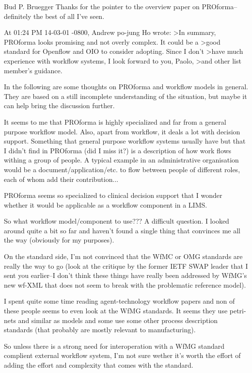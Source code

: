 Bud P. Bruegger \cite{openoutcomesgeneral}
Thanks for the pointer to the overview paper on PROforma--definitely the
best of all I've seen.

At 01:24 PM 14-03-01 -0800, Andrew po-jung Ho wrote:
>In summary, PROforma looks promising and not overly complex. It could be a
>good standard for Openflow and OIO to consider adopting. Since I don't
>have much experience with workflow systems, I look forward to you, Paolo,
>and other list member's guidance.

In the following are some thoughts on PROforma and workflow models in
general.  They are based on a still incomplete understanding of the
situation, but maybe it can help bring the discussion further.

It seems to me that PROforma is highly specialized and far from a general
purpose workflow model.  Also, apart from workflow, it deals a lot with
decision support.  Something that general purpose workflow systems usually
have but that I didn't find in PROforma (did I miss it?) is a description
of how work flows withing a group of people.  A typical example in an
administrative organisation would be a document/application/etc. to flow
between people of different roles, each of whom add their contribution...

PROforma seems so specialized to clinical decision support that I wonder
whether it would be applicable as a workflow component in a LIMS.

So what workflow model/component to use???  A difficult question.  I looked
around quite a bit so far and haven't found a single thing that convinces
me all the way (obviously for my purposes).

On the standard side, I'm not convinced that the WfMC or OMG standards are
really the way to go  (look at the critique by the former IETF SWAP leader
that I sent you earlier--I don't think these things have really been
addressed by WfMG's new wf-XML that does not seem to break with the
problematic reference model).

I spent quite some time reading agent-technology workflow papers and non of
these people seems to even look at the WfMG standards.  It seems they use
petri-nets and similar as models and some use some other process
description standards (that probably are mostly relevant to manufacturing).

So unless there is a strong need for interoperation with a WfMG standard
complient external workflow system, I'm not sure wether it's worth the
effort of adding the effort and complexity that comes with the standard.

